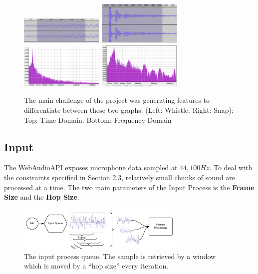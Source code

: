 \documentclass[DIV=calc, paper=a4, fontsize=11pt, twocolumn]{scrartcl}   %
\begin{document}
   \begin{figure}[h]
   \centering
   \includegraphics[width=40mm]{figures/whistle_frame_t.png}
   \includegraphics[width=40mm]{figures/snapTimeDomainFrame.png}
   \includegraphics[width=40mm]{figures/whistle_frame_f.png}
   \includegraphics[width=40mm]{figures/SnapFreqDomainFrame.png}
   \caption{The main challenge of the project was generating features to differentiate between these two graphs. (Left: Whistle. Right: Snap); Top: Time Domain. Bottom: Frequency Domain}
   \label{overflow}
   \end{figure}



\subsection{Input}
The WebAudioAPI exposes microphone data sampled at $44,100Hz$. To deal with the constraints specified in Section 2.3, relatively small chunks of sound are processed at a time. The two main parameters of the Input Process is the \textbf{Frame Size} and the \textbf{Hop Size}.
\begin{figure}[h]
\centering
\includegraphics[width=80mm]{figures/InputDiagram.png}
\caption{The input process queue. The sample is retrieved by a window which is moved by a ``hop size'' every iteration.}
\label{overflow}
\end{figure}
\end{document}
